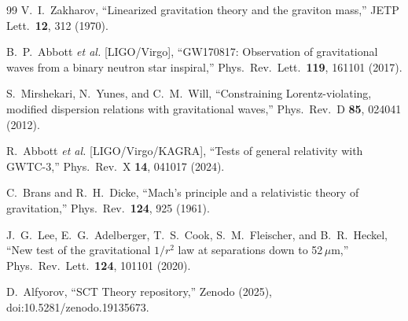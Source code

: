\documentclass[12pt,a4paper]{article}
\begin{document}
\begin{thebibliography}{99}
V.~I.~Zakharov,
``Linearized gravitation theory and the graviton mass,''
JETP Lett.\ \textbf{12}, 312 (1970).

B.~P.~Abbott \emph{et al.} [LIGO/Virgo],
``GW170817: Observation of gravitational waves from a binary neutron star
inspiral,''
Phys.\ Rev.\ Lett.\ \textbf{119}, 161101 (2017).

S.~Mirshekari, N.~Yunes, and C.~M.~Will,
``Constraining Lorentz-violating, modified dispersion relations with
gravitational waves,''
Phys.\ Rev.\ D \textbf{85}, 024041 (2012).

R.~Abbott \emph{et al.} [LIGO/Virgo/KAGRA],
``Tests of general relativity with GWTC-3,''
Phys.\ Rev.\ X \textbf{14}, 041017 (2024).

C.~Brans and R.~H.~Dicke,
``Mach's principle and a relativistic theory of gravitation,''
Phys.\ Rev.\ \textbf{124}, 925 (1961).

J.~G.~Lee, E.~G.~Adelberger, T.~S.~Cook, S.~M.~Fleischer, and B.~R.~Heckel,
``New test of the gravitational $1/r^2$ law at separations down to 52\,$\mu$m,''
Phys.\ Rev.\ Lett.\ \textbf{124}, 101101 (2020).

D.~Alfyorov,
``SCT Theory repository,''
Zenodo (2025), doi:10.5281/zenodo.19135673.

\end{thebibliography}
\end{document}
